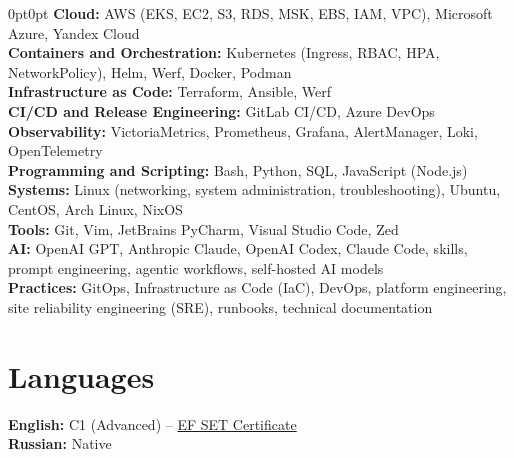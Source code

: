 \documentclass[12pt,letterpaper]{article}
\newenvironment{block}{%
  \begin{adjustwidth}{0pt}{0pt}}{%
  \end{adjustwidth}}
\begin{document}
\begin{block}
  \textbf{Cloud:}
  AWS (EKS, EC2, S3, RDS, MSK, EBS, IAM, VPC),
  Microsoft Azure, Yandex Cloud\\

  \textbf{Containers and Orchestration:}
  Kubernetes (Ingress, RBAC, HPA, NetworkPolicy),
  Helm, Werf, Docker, Podman\\

  \textbf{Infrastructure as Code:}
  Terraform, Ansible, Werf\\

  \textbf{CI/CD and Release Engineering:}
  GitLab CI/CD, Azure DevOps\\

  \textbf{Observability:}
  VictoriaMetrics, Prometheus, Grafana, AlertManager, Loki, OpenTelemetry\\

  \textbf{Programming and Scripting:}
  Bash, Python, SQL, JavaScript (Node.js)\\

  \textbf{Systems:}
  Linux (networking, system administration, troubleshooting),
  Ubuntu, CentOS, Arch Linux, NixOS\\

  \textbf{Tools:}
  Git, Vim, JetBrains PyCharm,
  Visual Studio Code, Zed\\

  \textbf{AI:}
  OpenAI GPT, Anthropic Claude, OpenAI Codex,
  Claude Code, skills, prompt engineering,
  agentic workflows, self-hosted AI models\\

  \textbf{Practices:}
  GitOps, Infrastructure as Code (IaC),
  DevOps, platform engineering, site reliability
  engineering (SRE), runbooks, technical documentation
\end{block}

\section{Languages}

\textbf{English:} C1 (Advanced) --
\href{https://cert.efset.org/vgPPkG?cid=em100a}
  {EF SET Certificate }\\
\textbf{Russian:} Native
\end{document}
